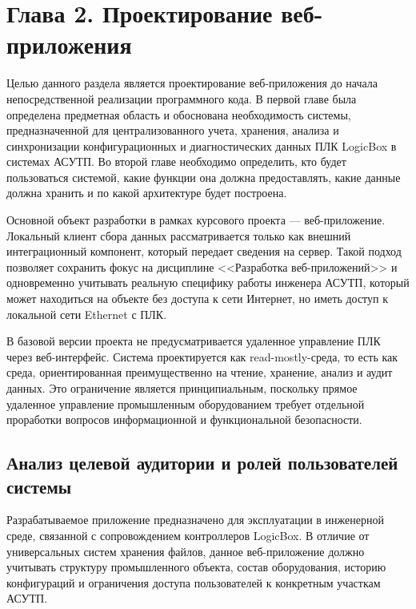 \section*{Глава 2. Проектирование веб-приложения}
\label{sec:chapter2}

\providecommand{\tabref}[1]{\hyperref[#1]{таблице~\ref*{#1}}}
\providecommand{\figref}[1]{\hyperref[#1]{рисунке~\ref*{#1}}}

Целью данного раздела является проектирование веб-приложения до начала
непосредственной реализации программного кода. В первой главе была определена
предметная область и обоснована необходимость системы, предназначенной для
централизованного учета, хранения, анализа и синхронизации конфигурационных и
диагностических данных ПЛК LogicBox в системах АСУТП. Во второй главе
необходимо определить, кто будет пользоваться системой, какие функции она должна
предоставлять, какие данные должна хранить и по какой архитектуре будет
построена.

Основной объект разработки в рамках курсового проекта --- веб-приложение.
Локальный клиент сбора данных рассматривается только как внешний интеграционный
компонент, который передает сведения на сервер. Такой подход позволяет сохранить
фокус на дисциплине <<Разработка веб-приложений>> и одновременно учитывать
реальную специфику работы инженера АСУТП, который может находиться на объекте
без доступа к сети Интернет, но иметь доступ к локальной сети Ethernet с ПЛК.

В базовой версии проекта не предусматривается удаленное управление ПЛК через
веб-интерфейс. Система проектируется как read-mostly-среда, то есть как среда,
ориентированная преимущественно на чтение, хранение, анализ и аудит данных. Это
ограничение является принципиальным, поскольку прямое удаленное управление
промышленным оборудованием требует отдельной проработки вопросов
информационной и функциональной безопасности.

\subsection{Анализ целевой аудитории и ролей пользователей системы}

Разрабатываемое приложение предназначено для эксплуатации в инженерной среде,
связанной с сопровождением контроллеров LogicBox. В отличие от универсальных
систем хранения файлов, данное веб-приложение должно учитывать структуру
промышленного объекта, состав оборудования, историю конфигураций и ограничения
доступа пользователей к конкретным участкам АСУТП.


